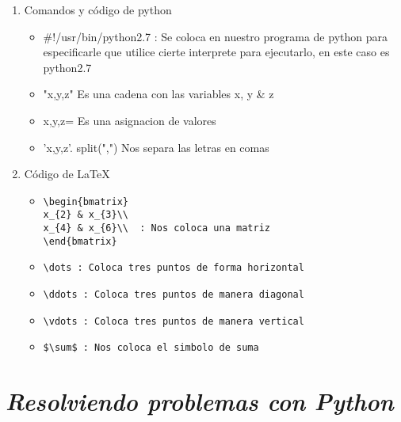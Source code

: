 \documentclass{book}
\begin{document}
\begin{enumerate}
	\item Comandos y código de python
	\begin{itemize}
		\item \#!/usr/bin/python2.7  : Se coloca en nuestro programa de python para especificarle que utilice cierte interprete para ejecutarlo, en este caso es python2.7
		\item "x,y,z" Es una cadena con las variables x, y \& z
		\item x,y,z= Es una asignacion de valores
		\item 'x,y,z'. split(",") Nos separa las letras en comas
	\end{itemize}
	\item Código de \LaTeX
	\begin{itemize}
		\item 
		\begin{lstlisting}
\begin{bmatrix}
x_{2} & x_{3}\\
x_{4} & x_{6}\\  : Nos coloca una matriz
\end{bmatrix}
		\end{lstlisting}
		\item 
		\begin{lstlisting}
\dots : Coloca tres puntos de forma horizontal
		\end{lstlisting}
		\item 
		\begin{lstlisting}
\ddots : Coloca tres puntos de manera diagonal
		\end{lstlisting}
		\item 
		\begin{lstlisting}
\vdots : Coloca tres puntos de manera vertical
		\end{lstlisting}
		
		
		\item 
		\begin{lstlisting}
$\sum$ : Nos coloca el simbolo de suma
		\end{lstlisting}
		
		
	\end{itemize}	
	
	
	
	
\end{enumerate}%





	\section{\textit{Resolviendo problemas con Python}}%
\begin{flushright}
	\date{17 de enero de 2019}
\end{flushright}
\end{document}
